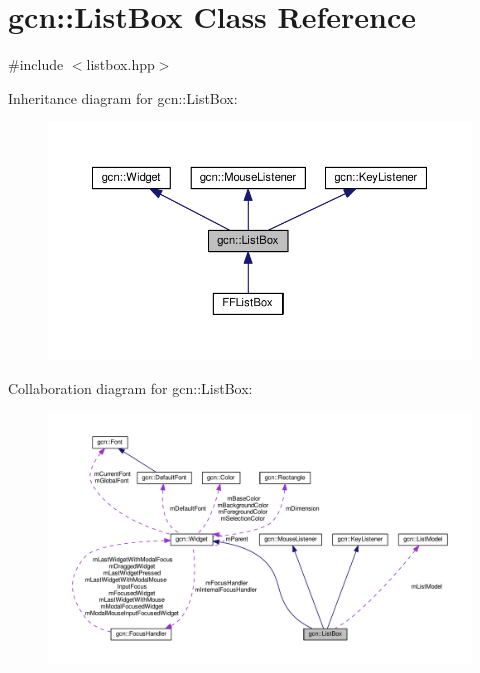 \hypertarget{classgcn_1_1ListBox}{}\section{gcn\+:\+:List\+Box Class Reference}
\label{classgcn_1_1ListBox}


{\ttfamily \#include $<$listbox.\+hpp$>$}



Inheritance diagram for gcn\+:\+:List\+Box\+:\nopagebreak
\begin{figure}[H]
\begin{center}
\leavevmode
\includegraphics[width=350pt]{classgcn_1_1ListBox__inherit__graph}
\end{center}
\end{figure}


Collaboration diagram for gcn\+:\+:List\+Box\+:\nopagebreak
\begin{figure}[H]
\begin{center}
\leavevmode
\includegraphics[width=350pt]{classgcn_1_1ListBox__coll__graph}
\end{center}
\end{figure}
